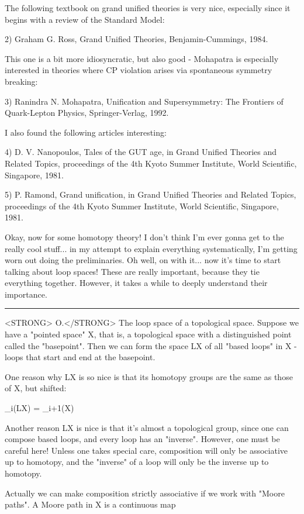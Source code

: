 The following textbook on grand unified theories is very nice,
especially since it begins with a review of the Standard Model:

2) Graham G. Ross, Grand Unified Theories, Benjamin-Cummings, 1984.

This one is a bit more idiosyncratic, but also good - Mohapatra
is especially interested in theories where CP violation arises via
spontaneous symmetry breaking:

3) Ranindra N. Mohapatra, Unification and Supersymmetry: The Frontiers
of Quark-Lepton Physics, Springer-Verlag, 1992.

I also found the following articles interesting:

4) D. V. Nanopoulos, Tales of the GUT age, in Grand Unified Theories
and Related Topics, proceedings of the 4th Kyoto Summer Institute,
World Scientific, Singapore, 1981.

5) P. Ramond, Grand unification, in Grand Unified Theories and Related
Topics, proceedings of the 4th Kyoto Summer Institute, World
Scientific, Singapore, 1981.

Okay, now for some homotopy theory!  I don't think I'm ever gonna get
to the really cool stuff... in my attempt to explain everything
systematically, I'm getting worn out doing the preliminaries.  Oh well,
on with it... now it's time to start talking about loop spaces!  These
are really important, because they tie everything together.  However, 
it takes a while to deeply understand their importance.  
\par\noindent\rule{\textwidth}{0.4pt}
<STRONG> O.</STRONG> The loop space of a topological space.  Suppose we have a "pointed
space" X, that is, a topological space with a distinguished point
called the "basepoint".  Then we can form the space LX of all "based
loops" in X - loops that start and end at the basepoint.

One reason why LX is so nice is that its homotopy groups are the same
as those of X, but shifted:

\pi _{i}(LX) = \pi _{i+1}(X) 

Another reason LX is nice is that it's almost a topological group,
since one can compose based loops, and every loop has an "inverse".
However, one must be careful here!  Unless one takes special care,
composition will only be associative up to homotopy, and the "inverse"
of a loop will only be the inverse up to homotopy.

Actually we can make composition strictly associative if we work with
"Moore paths".  A Moore path in X is a continuous map

